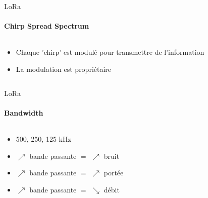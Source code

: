 \begin{frame}{LoRa}
\framesubtitle{Chirp Spread Spectrum}
\begin{columns}
  \begin{column}{0.5\textwidth}
    \begin{itemize}
      \item Chaque 'chirp' est modulé pour transmettre de l'information
      \item La modulation est propriétaire
    \end{itemize}
  \end{column}
  \begin{column}{0.5\textwidth}
    \begin{center}
    \end{center}
  \end{column}
\end{columns}
\end{frame}

\begin{frame}{LoRa}
\framesubtitle{Bandwidth}
\begin{columns}
\begin{column}{0.5\textwidth}
    
\begin{itemize}
  \item 500, 250, 125 kHz
  \item $\nearrow$ bande passante $=$ $\nearrow$ bruit
  \item $\nearrow$ bande passante $=$ $\nearrow$ portée
  \item $\nearrow$ bande passante $=$ $\searrow$ débit
\end{itemize}
\end{column}
\begin{column}{0.5\textwidth}
  
\end{column}
\end{columns}
\end{frame}

